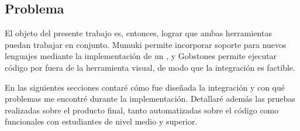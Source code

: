 \subsection{Problema}
El objeto del presente trabajo es, entonces, lograr que ambas herramientas puedan trabajar en conjunto. Mumuki permite incorporar soporte para nuevos lenguajes mediante la implementación de un \runner, y Gobstones permite ejecutar código por fuera de la herramienta visual, de modo que la integración es factible.

En las siguientes secciones contaré cómo fue diseñada la integración y con qué problemas me encontré durante la implementación. Detallaré además las pruebas realizadas sobre el producto final, tanto automatizadas sobre el código como funcionales con estudiantes de nivel medio y superior.
